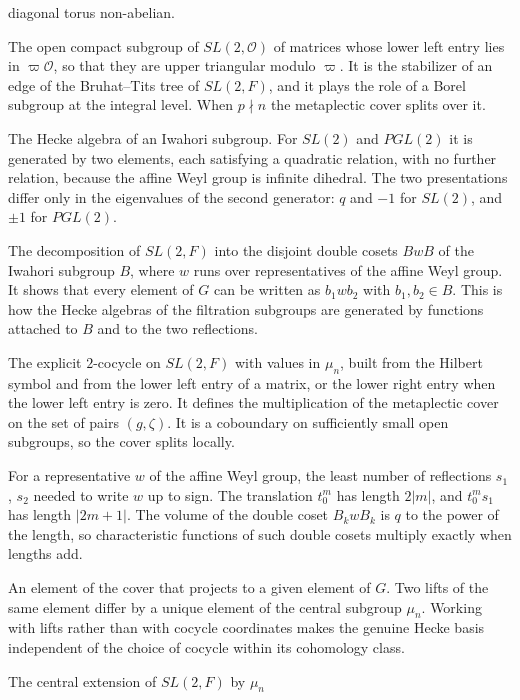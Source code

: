 \documentclass[12pt,letterpaper]{amsart}
\numberwithin{equation}{section}
\theoremstyle{definition}
\theoremstyle{remark}
\newcommand{\cO}{\mathcal{O}}
\begin{document}
\begin{description}[leftmargin=1.5em,style=nextline]
diagonal torus non-abelian.
\item[Iwahori subgroup] The open compact subgroup of $SL(2,\cO)$ of
matrices whose lower left entry lies in $\varpi\cO$, so that they are
upper triangular modulo $\varpi$. It is the stabilizer of an edge of the
Bruhat--Tits tree of $SL(2,F)$, and it plays the role of a Borel
subgroup at the integral level. When $p\nmid n$ the metaplectic cover
splits over it.
\item[Iwahori--Hecke algebra] The Hecke algebra of an Iwahori
subgroup. For $SL(2)$ and $PGL(2)$ it is generated by two elements, each
satisfying a quadratic relation, with no further relation, because the
affine Weyl group is infinite dihedral. The two presentations differ
only in the eigenvalues of the second generator: $q$ and $-1$ for
$SL(2)$, and $\pm1$ for $PGL(2)$.
\item[Iwahori--Bruhat decomposition] The decomposition of $SL(2,F)$ into
the disjoint double cosets $BwB$ of the Iwahori subgroup $B$, where $w$
runs over representatives of the affine Weyl group. It shows that every
element of $G$ can be written as $b_1wb_2$ with $b_1,b_2\in B$. This is
how the Hecke algebras of the filtration subgroups are generated by
functions attached to $B$ and to the two reflections.
\item[Kubota's cocycle] The explicit $2$-cocycle on $SL(2,F)$ with
values in $\mu_n$, built from the Hilbert symbol and from the lower left
entry of a matrix, or the lower right entry when the lower left entry is
zero. It defines the multiplication of the metaplectic cover on the set
of pairs $(g,\zeta)$. It is a coboundary on sufficiently small open
subgroups, so the cover splits locally.
\item[Length] For a representative $w$ of the affine Weyl group, the
least number of reflections $s_1$, $s_2$ needed to write $w$ up to sign.
The translation $t_0^m$ has length $2|m|$, and $t_0^ms_1$ has length
$|2m+1|$. The volume of the double coset $B_kwB_k$ is $q$ to the power
of the length, so characteristic functions of such double cosets
multiply exactly when lengths add.
\item[Lift] An element of the cover that projects to a given element of
$G$. Two lifts of the same element differ by a unique element of the
central subgroup $\mu_n$. Working with lifts rather than with cocycle
coordinates makes the genuine Hecke basis independent of the choice of
cocycle within its cohomology class.
\item[Metaplectic cover] The central extension of $SL(2,F)$ by $\mu_n$

\end{description}
\end{document}
